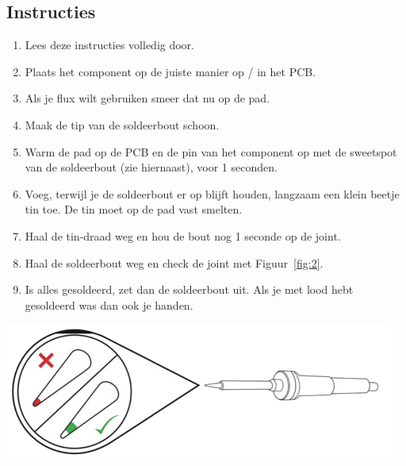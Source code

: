 \documentclass{guide}
\begin{document}
\subsection{Instructies}
\begin{minipage}{.55\textwidth}
  \begin{enumerate}
  \item Lees deze instructies volledig door.
  \item Plaats het component op de juiste manier op / in het PCB.
  \item Als je flux wilt gebruiken smeer dat nu op de pad.
  \item Maak de tip van de soldeerbout schoon.
  \item Warm de pad op de PCB en de pin van het component op met de sweetspot van de soldeerbout (zie hiernaast), voor 1 seconden.
  \item Voeg, terwijl je de soldeerbout er op blijft houden, langzaam een klein beetje tin toe. De tin moet op de pad vast smelten.
  \item Haal de tin-draad weg en hou de bout nog 1 seconde op de joint.
  \item Haal de soldeerbout weg en check de joint met Figuur~\ref{fig:2}.
  \item Is alles gesoldeerd, zet dan de soldeerbout uit. Als je met lood hebt gesoldeerd was dan ook je handen.
  \end{enumerate}
\end{minipage}\quad\begin{minipage}{.40\textwidth}
  \includegraphics[width=\textwidth]{images/iron_hotspot.png}
  \label{wrap-fig:1}
\end{minipage}
\end{document}
